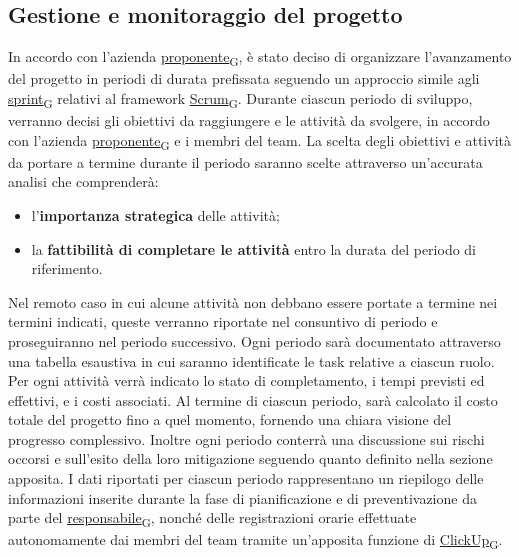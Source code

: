 \subsection{Gestione e monitoraggio del progetto}
In accordo con l'azienda \href{https://7last.github.io/docs/rtb/documentazione-interna/glossario\#proponente}{proponente\textsubscript{G}}, è stato deciso di organizzare l’avanzamento del progetto in periodi di durata prefissata seguendo un approccio simile agli \href{https://7last.github.io/docs/rtb/documentazione-interna/glossario\#sprint}{sprint\textsubscript{G}} relativi al framework \href{https://7last.github.io/docs/rtb/documentazione-interna/glossario\#scrum}{Scrum\textsubscript{G}}.
Durante ciascun periodo di sviluppo, verranno decisi gli obiettivi da raggiungere e le attività da svolgere, in accordo con l'azienda \href{https://7last.github.io/docs/rtb/documentazione-interna/glossario\#proponente}{proponente\textsubscript{G}} e i membri del team. La scelta degli obiettivi e attività da portare a termine durante il periodo saranno scelte attraverso un'accurata analisi che comprenderà:
\begin{itemize}
    \item l'\textbf{importanza strategica} delle attività;
    \item la \textbf{fattibilità di completare le attività} entro la durata del periodo di riferimento.
\end{itemize}
Nel remoto caso in cui alcune attività non debbano essere portate a termine nei termini indicati, queste verranno riportate nel consuntivo di periodo e proseguiranno nel periodo successivo. Ogni periodo sarà documentato attraverso una tabella esaustiva in cui saranno identificate le task relative a ciascun ruolo. Per ogni attività verrà indicato lo stato di completamento, i tempi previsti ed effettivi, e i costi associati. Al termine di ciascun periodo, sarà calcolato il costo totale del progetto fino a quel momento, fornendo una chiara visione del progresso complessivo.
Inoltre ogni periodo conterrà una discussione sui rischi occorsi e sull’esito della loro mitigazione seguendo quanto definito nella sezione apposita.
I dati riportati per ciascun periodo rappresentano un riepilogo delle informazioni inserite durante la fase di pianificazione e di preventivazione da parte del \href{https://7last.github.io/docs/rtb/documentazione-interna/glossario\#responsabile}{responsabile\textsubscript{G}}, nonché delle registrazioni orarie effettuate autonomamente dai membri del team tramite un'apposita funzione di \href{https://7last.github.io/docs/rtb/documentazione-interna/glossario\#clickup}{ClickUp\textsubscript{G}}.
